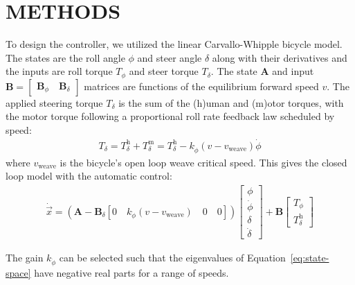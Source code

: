 \documentclass{icsc}
\begin{document}
\section{METHODS}
%
To design the controller, we utilized the linear Carvallo-Whipple bicycle model.
The states are the roll angle \(\phi\) and steer angle \(\delta\) along with
their derivatives and the inputs are roll torque \(T_\phi\) and steer torque
\(T_\delta\). The state \(\mathbf{A}\) and input \(\mathbf{B} =
\begin{bmatrix}\mathbf{B}_\phi \quad \mathbf{B}_\delta\end{bmatrix} \)
matrices are functions of the equilibrium forward speed \(v\). The applied
steering torque \(T_\delta\) is the sum of the (h)uman and (m)otor torques,
with the motor torque following a proportional roll rate feedback law scheduled
by speed:
%
\begin{align}
  T_\delta =
  T_\delta^\textrm{h} + T_\delta^\textrm{m} =
  T_\delta^\textrm{h} - k_{\dot{\phi}}(v - v_\textrm{weave})\dot{\phi}
\end{align}
where \(v_\textrm{weave}\) is the bicycle's open loop weave critical speed.
This gives the closed loop model with the automatic control:
%
\begin{align}
  \dot{\vec{x}} =
  \left(
    \mathbf{A} - \mathbf{B}_\delta
    \left[0 \quad k_{\dot{\phi}}(v - v_\textrm{weave}) \quad 0 \quad 0\right]
  \right)
  \begin{bmatrix} \phi \\ \dot{\phi} \\ \delta \\ \dot{\delta} \end{bmatrix} +
  \mathbf{B}
  \begin{bmatrix} T_{\phi} \\ T_\delta^\textrm{h} \end{bmatrix}
  \label{eq:state-space}
\end{align}

The gain \(k_{\dot{\phi}}\) can be selected such that the eigenvalues of
Equation~\ref{eq:state-space} have negative real parts for a range of speeds.
\end{document}
